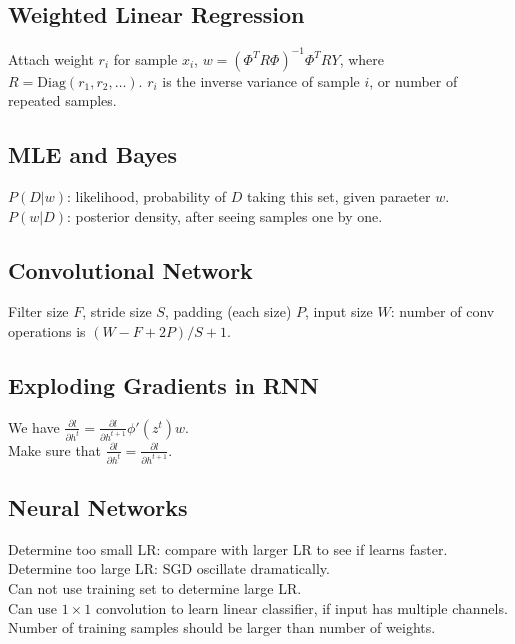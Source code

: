 \subsection*{Weighted Linear Regression}

Attach weight $r_i$ for sample $x_i$, $w = (\Phi^T R \Phi)^{-1}\Phi^T R Y$, where $R = \text{Diag}(r_1, r_2, \dots)$. $r_i$ is the inverse variance of sample $i$, or number of repeated samples.

\subsection*{MLE and Bayes}

$P(D|w)$: likelihood, probability of $D$ taking this set, given paraeter $w$.\\
$P(w|D)$: posterior density, after seeing samples one by one.

\subsection*{Convolutional Network}

Filter size $F$, stride size $S$, padding (each size) $P$, input size $W$: number of conv operations is $(W-F+2P)/S + 1$.

\subsection*{Exploding Gradients in RNN}

We have $\frac{\partial l}{\partial h^t} = \frac{\partial l}{\partial h^{t+1}} \phi'(z^t)w$.\\
Make sure that $\frac{\partial l}{\partial h^t} = \frac{\partial l}{\partial h^{t+1}}$.

\subsection*{Neural Networks}

Determine too small LR: compare with larger LR to see if learns faster.\\
Determine too large LR: SGD oscillate dramatically.\\
Can not use training set to determine large LR.\\
Can use $1 \times 1$ convolution to learn linear classifier, if input has multiple channels.\\
Number of training samples should be larger than number of weights.
